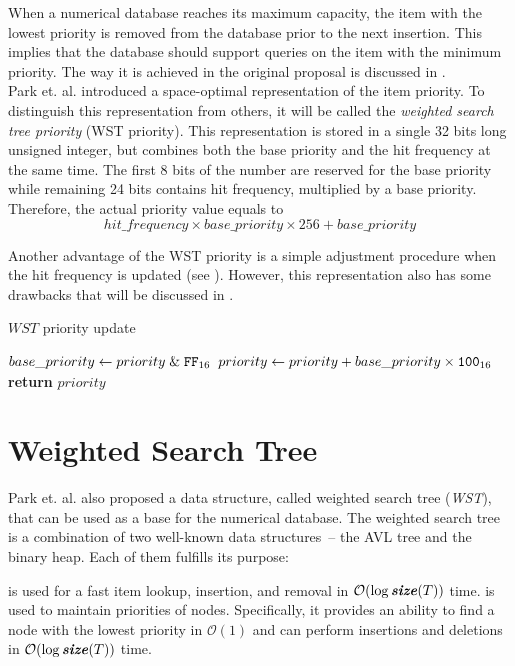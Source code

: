 When a numerical database reaches its maximum capacity, the item with the lowest priority is removed from the database prior to the next insertion. This implies that the database should support queries on the item with the minimum priority. The way it is achieved in the original proposal is discussed in .
\\

Park et. al. introduced a space-optimal representation of the item priority. To distinguish this representation from others, it will be called the \emph{weighted search tree priority} (WST priority). This representation is stored in a single 32 bits long unsigned integer, but combines both the base priority and the hit frequency at the same time. The first 8 bits of the number are reserved for the base priority while remaining 24 bits contains hit frequency, multiplied by a base priority.
Therefore, the actual priority value equals to
\begin{equation}
hit\_frequency \times base\_priority \times 256 + base\_priority
\end{equation}

Another advantage of the WST priority is a simple adjustment procedure when the hit frequency is updated (see ). However, this representation also has some drawbacks that will be discussed in .
\begin{algorithm}[]
\caption{$WST$ priority update}\label{alg:wst_priority1}
\begin{algorithmic}[1]
    \State $base\_priority\gets priority \mathrel{\&} \texttt{FF}_{16}$
    \State $priority \gets priority + base\_priority \times \texttt{100}_{16}$
    \State {}
    \State \textbf{return} $priority$
  \EndProcedure
\end{algorithmic}
\end{algorithm}

\section{Weighted Search Tree}
\label{sec:wst}
Park et. al. also proposed a data structure, called weighted search tree (\emph{WST}), that can be used as a base for the numerical database. The weighted search tree is a combination of two well-known data structures~-- the AVL tree and the binary heap. Each of them fulfills its purpose:
\begin{block-description}
 is used for a fast item lookup, insertion, and removal in $\mathcal{O}(\log{\ensuremath{\textbf{\textit{size}}(T)}})$ time.
 is used to maintain priorities of nodes. Specifically, it provides an ability to find a node with the lowest priority in $\mathcal{O}(1)$ and can perform insertions and deletions in $\mathcal{O}(\log{\ensuremath{\textbf{\textit{size}}(T)}})$ time.
\end{block-description}

